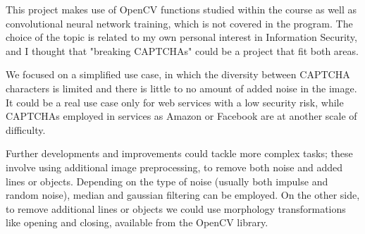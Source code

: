 This project makes use of OpenCV functions studied within the course as well as convolutional neural network training, which is not covered in the program. The choice of the topic is related to my own personal interest in Information Security, and I thought that "breaking CAPTCHAs" could be a project that fit both areas.

We focused on a simplified use case, in which the diversity between CAPTCHA characters is limited and there is little to no amount of added noise in the image. It could be a real use case only for web services with a low security risk, while CAPTCHAs employed in services as Amazon or Facebook are at another scale of difficulty.

Further developments and improvements could tackle more complex tasks; these involve using additional image preprocessing, to remove both noise and added lines or objects. Depending on the type of noise (usually both impulse and random noise), median and gaussian filtering can be employed. On the other side, to remove additional lines or objects we could use morphology transformations like opening and closing, available from the OpenCV library.